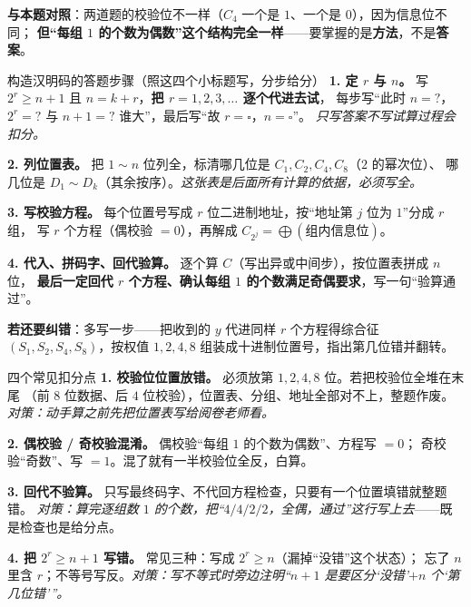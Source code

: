 \documentclass[11pt,a4paper]{ctexart}
\begin{document}
\textbf{与本题对照}：两道题的校验位不一样（$C_4$ 一个是 $1$、一个是 $0$），因为信息位不同；
\textbf{但“每组 $1$ 的个数为偶数”这个结构完全一样}——要掌握的是\textbf{方法}，不是\textbf{答案}。

\begin{exam}{构造汉明码的答题步骤（照这四个小标题写，分步给分）}
\textbf{1. 定 $r$ 与 $n$。} 写 $2^{r}\ge n+1$ 且 $n=k+r$，\textbf{把 $r=1,2,3,\dots$ 逐个代进去试}，
每步写“此时 $n=?$，$2^{r}=?$ 与 $n+1=?$ 谁大”，最后写“故 $r=\square$，$n=\square$”。
\emph{只写答案不写试算过程会扣分。}

\textbf{2. 列位置表。} 把 $1\sim n$ 位列全，标清哪几位是 $C_1,C_2,C_4,C_8$（$2$ 的幂次位）、
哪几位是 $D_1\sim D_k$（其余按序）。\emph{这张表是后面所有计算的依据，必须写全。}

\textbf{3. 写校验方程。} 每个位置号写成 $r$ 位二进制地址，按“地址第 $j$ 位为 $1$”分成 $r$ 组，
写 $r$ 个方程（偶校验 $=0$），再解成 $C_{2^{j}}=\bigoplus(\text{组内信息位})$。

\textbf{4. 代入、拼码字、回代验算。} 逐个算 $C$（写出异或中间步），按位置表拼成 $n$ 位，
\textbf{最后一定回代 $r$ 个方程、确认每组 $1$ 的个数满足奇偶要求}，写一句“验算通过”。

\medskip
\textbf{若还要纠错}：多写一步——把收到的 $y$ 代进同样 $r$ 个方程得综合征
$(S_1,S_2,S_4,S_8)$，按权值 $1,2,4,8$ 组装成十进制位置号，指出第几位错并翻转。
\end{exam}

\begin{exam}{四个常见扣分点}
\textbf{1. 校验位位置放错。} 必须放第 $1,2,4,8$ 位。若把校验位全堆在末尾
（前 $8$ 位数据、后 $4$ 位校验），位置表、分组、地址全部对不上，整题作废。
\emph{对策：动手算之前先把位置表写给阅卷老师看。}

\textbf{2. 偶校验 / 奇校验混淆。} 偶校验“每组 $1$ 的个数为偶数”、方程写 $=0$；
奇校验“奇数”、写 $=1$。混了就有一半校验位全反，白算。

\textbf{3. 回代不验算。} 只写最终码字、不代回方程检查，只要有一个位置填错就整题错。
\emph{对策：算完逐组数 $1$ 的个数，把“$4/4/2/2$，全偶，通过”这行写上去}——既是检查也是给分点。

\textbf{4. 把 $2^{r}\ge n+1$ 写错。} 常见三种：写成 $2^{r}\ge n$（漏掉“没错”这个状态）；
忘了 $n$ 里含 $r$；不等号写反。\emph{对策：写不等式时旁边注明“$n+1$ 是要区分‘没错’$+n$ 个‘第几位错’”。}
\end{exam}
\end{document}
